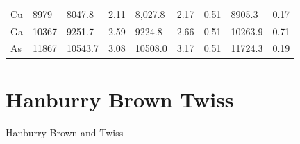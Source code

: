 \begin{table}[h]
\begin{tabular}{l|l|ll|lll|ll}
		Cu      & 8979                                                   & 8047.8                                                & 2.11                                                 & 8,027.8                                                & 2.17                                                 & 0.51                                                      & 8905.3                                                & 0.17                                                      \\
		Ga      & 10367                                                  & 9251.7                                                 & 2.59                                                 & 9224.8                                                 & 2.66                                                 & 0.51                                                      & 10263.9                                               & 0.71                                                      \\
		As      & 11867                                                  & 10543.7                                                & 3.08                                                 & 10508.0                                                & 3.17                                                 & 0.51                                                      & 11724.3                                               & 0.19                                                      \\ \hline
	\end{tabular}
\end{table}
\FloatBarrier
\section{Hanburry Brown Twiss}
Hanburry Brown and Twiss 


